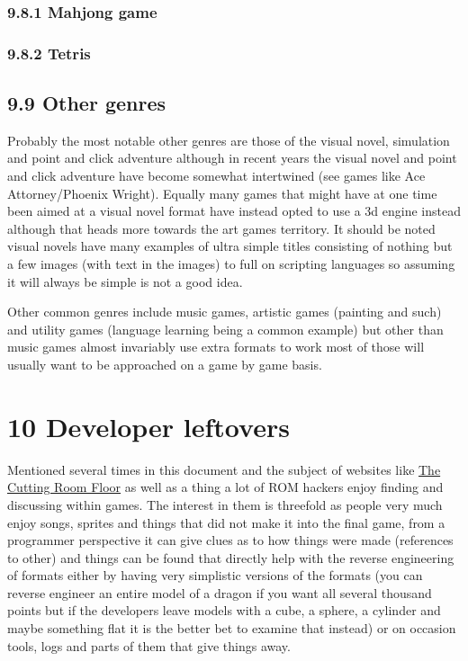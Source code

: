 \documentclass[
]{book}
\begin{document}
\hypertarget{mahjong-game}{%
\subsection{9.8.1 Mahjong game}\label{mahjong-game}}

\hypertarget{tetris}{%
\subsection{9.8.2 Tetris}\label{tetris}}

\hypertarget{other-genres}{%
\section{9.9 Other genres}\label{other-genres}}

Probably the most notable other genres are those of the visual novel, simulation and point and click adventure although in recent years the visual novel and point and click adventure have become somewhat intertwined (see games like Ace Attorney/Phoenix Wright). Equally many games that might have at one time been aimed at a visual novel format have instead opted to use a 3d engine instead although that heads more towards the art games territory. It should be noted visual novels have many examples of ultra simple titles consisting of nothing but a few images (with text in the images) to full on scripting languages so assuming it will always be simple is not a good idea.

Other common genres include music games, artistic games (painting and such) and utility games (language learning being a common example) but other than music games almost invariably use extra formats to work most of those will usually want to be approached on a game by game basis.

\hypertarget{developer-leftovers}{%
\chapter{10 Developer leftovers}\label{developer-leftovers}}

Mentioned several times in this document and the subject of websites like \href{http://tcrf.net/The_Cutting_Room_Floor}{The Cutting Room Floor} as well as a thing a lot of ROM hackers enjoy finding and discussing within games. The interest in them is threefold as people very much enjoy songs, sprites and things that did not make it into the final game, from a programmer perspective it can give clues as to how things were made (references to other) and things can be found that directly help with the reverse engineering of formats either by having very simplistic versions of the formats (you can reverse engineer an entire model of a dragon if you want all several thousand points but if the developers leave models with a cube, a sphere, a cylinder and maybe something flat it is the better bet to examine that instead) or on occasion tools, logs and parts of them that give things away.
\end{document}
